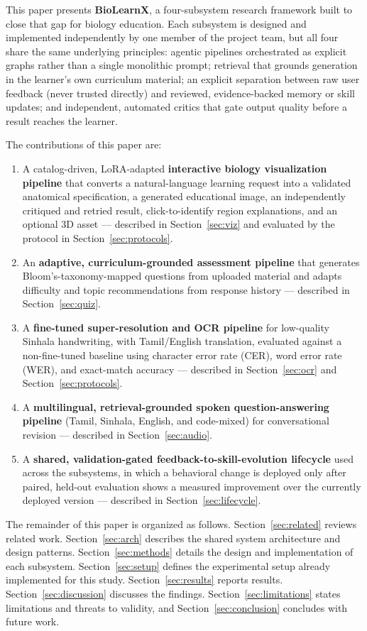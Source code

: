 \documentclass[conference]{IEEEtran}
\begin{document}
This paper presents \textbf{BioLearnX}, a four-subsystem research framework built to close that gap for biology education. Each subsystem is designed and implemented independently by one member of the project team, but all four share the same underlying principles: agentic pipelines orchestrated as explicit graphs rather than a single monolithic prompt; retrieval that grounds generation in the learner's own curriculum material; an explicit separation between raw user feedback (never trusted directly) and reviewed, evidence-backed memory or skill updates; and independent, automated critics that gate output quality before a result reaches the learner.

The contributions of this paper are:
\begin{enumerate}
\item A catalog-driven, LoRA-adapted \textbf{interactive biology visualization pipeline} that converts a natural-language learning request into a validated anatomical specification, a generated educational image, an independently critiqued and retried result, click-to-identify region explanations, and an optional 3D asset --- described in Section~\ref{sec:viz} and evaluated by the protocol in Section~\ref{sec:protocols}.
\item An \textbf{adaptive, curriculum-grounded assessment pipeline} that generates Bloom's-taxonomy-mapped questions from uploaded material and adapts difficulty and topic recommendations from response history --- described in Section~\ref{sec:quiz}.
\item A \textbf{fine-tuned super-resolution and OCR pipeline} for low-quality Sinhala handwriting, with Tamil/English translation, evaluated against a non-fine-tuned baseline using character error rate (CER), word error rate (WER), and exact-match accuracy --- described in Section~\ref{sec:ocr} and Section~\ref{sec:protocols}.
\item A \textbf{multilingual, retrieval-grounded spoken question-answering pipeline} (Tamil, Sinhala, English, and code-mixed) for conversational revision --- described in Section~\ref{sec:audio}.
\item A \textbf{shared, validation-gated feedback-to-skill-evolution lifecycle} used across the subsystems, in which a behavioral change is deployed only after paired, held-out evaluation shows a measured improvement over the currently deployed version --- described in Section~\ref{sec:lifecycle}.
\end{enumerate}

The remainder of this paper is organized as follows. Section~\ref{sec:related} reviews related work. Section~\ref{sec:arch} describes the shared system architecture and design patterns. Section~\ref{sec:methods} details the design and implementation of each subsystem. Section~\ref{sec:setup} defines the experimental setup already implemented for this study. Section~\ref{sec:results} reports results. Section~\ref{sec:discussion} discusses the findings. Section~\ref{sec:limitations} states limitations and threats to validity, and Section~\ref{sec:conclusion} concludes with future work.
\end{document}
